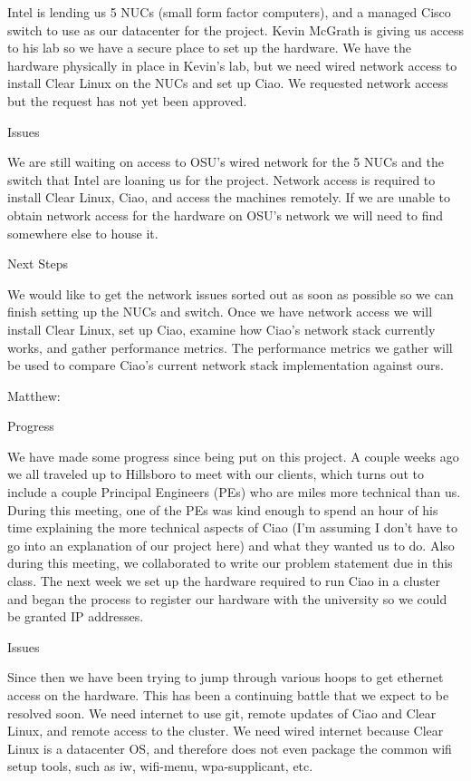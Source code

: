\documentclass[10pt,onecolumn,journal,draftclsnofoot]{IEEEtran}
\begin{document}
Intel is lending us 5 NUCs (small form factor computers), and a managed Cisco
switch to use as our datacenter for the project. Kevin McGrath is giving us
access to his lab so we have a secure place to set up the hardware. We have the
hardware physically in place in Kevin's lab, but we need wired network access to
install Clear Linux on the NUCs and set up Ciao. We requested network access but
the request has not yet been approved.

Issues

We are still waiting on access to OSU's wired network for the 5 NUCs and the
switch that Intel are loaning us for the project. Network access is required to
install Clear Linux, Ciao, and access the machines remotely. If we are unable to
obtain network access for the hardware on OSU's network we will need to find
somewhere else to house it.

Next Steps

We would like to get the network issues sorted out as soon as possible so we can
finish setting up the NUCs and switch. Once we have network access we will
install Clear Linux, set up Ciao, examine how Ciao's network stack currently
works, and gather performance metrics. The performance metrics we gather will be
used to compare Ciao's current network stack implementation against ours.

Matthew:

Progress

We have made some progress since being put on this project. A couple weeks ago
we all traveled up to Hillsboro to meet with our clients, which turns out to
include a couple Principal Engineers (PEs) who are miles more technical than us.
During this meeting, one of the PEs was kind enough to spend an hour of his time
explaining the more technical aspects of Ciao (I'm assuming I don't have to go
into an explanation of our project here) and what they wanted us to do. Also
during this meeting, we collaborated to write our problem statement due in this
class. The next week we set up the hardware required to run Ciao in a cluster
and began the process to register our hardware with the university so we could
be granted IP addresses.

Issues

Since then we have been trying to jump through various hoops to get ethernet
access on the hardware. This has been a continuing battle that we expect to be
resolved soon. We need internet to use git, remote updates of Ciao and Clear
Linux, and remote access to the cluster. We need wired internet because Clear
Linux is a datacenter OS, and therefore does not even package the common wifi
setup tools, such as iw, wifi-menu, wpa-supplicant, etc.
\end{document}
